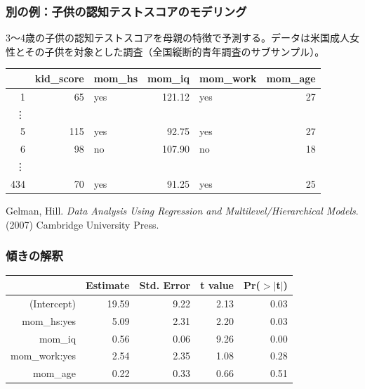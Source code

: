 
\begin{frame}
\frametitle{別の例：子供の認知テストスコアのモデリング}

3〜4歳の子供の認知テストスコアを母親の特徴で予測する。データは米国成人女性とその子供を対象とした調査（全国縦断的青年調査のサブサンプル）。

{\small
\begin{center}
\begin{tabular}{rrlrlr}
  \hline
 & kid\_score & mom\_hs & mom\_iq & mom\_work & mom\_age \\
  \hline
1 &  65 & yes & 121.12 & yes &  27 \\
  \vdots \\
  5 & 115 & yes & 92.75 & yes &  27 \\
  6 &  98 & no & 107.90 & no &  18 \\
  \vdots \\
  434 &  70 & yes & 91.25 & yes &  25 \\
   \hline
\end{tabular}
\end{center}
}

\vfill

{\tiny Gelman, Hill. \textit{Data Analysis Using Regression and Multilevel/Hierarchical Models}. (2007) Cambridge University Press.}

\end{frame}


\begin{frame}
\frametitle{傾きの解釈}


{\small
\begin{center}
\begin{tabular}{rrrrr}
  \hline
 & Estimate & Std. Error & t value & Pr($>$$|$t$|$) \\
  \hline
(Intercept) & 19.59 & 9.22 & 2.13 & 0.03 \\
  mom\_hs:yes & 5.09 & 2.31 & 2.20 & 0.03 \\
  mom\_iq & 0.56 & 0.06 & 9.26 & 0.00 \\
  mom\_work:yes & 2.54 & 2.35 & 1.08 & 0.28 \\
  mom\_age & 0.22 & 0.33 & 0.66 & 0.51 \\
   \hline
\end{tabular}
\end{center}
}

$\:$ \\


\end{frame}

